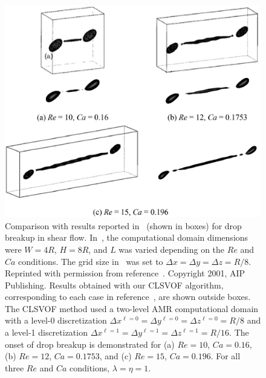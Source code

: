 \documentclass[review]{elsarticle}
\begin{document}
\begin{figure}[h!]
  \centering
  \includegraphics[width=\textwidth]{2-DropBreakComparison}
  \caption{Comparison with results reported 
	in~\cite{RenCri01-2} 
	(shown in boxes) 
        for drop breakup in shear flow.  
	In~\cite{RenCri01-2},
	the computational domain
        dimensions were 
	$W=4R$, $H=8R$, and $L$ was varied depending 
        on the $Re$ and $Ca$ conditions.  The
	grid size 
	in~\cite{RenCri01-2} 
	was set to 
        $\Delta x=\Delta y=\Delta z=R/8$.  
	Reprinted with permission from 
        reference~\cite{RenCri01-2}. 
	Copyright 2001, AIP Publishing. 
	Results
        obtained with our CLSVOF algorithm, corresponding to each case in
        reference~\cite{RenCri01-2}, are shown outside boxes.  The
        CLSVOF method used a two-level AMR computational domain 
        with a level-0 discretization 
	$\Delta x^{\ell=0} = \Delta y^{\ell=0} = \Delta z^{\ell=0} = R/8$ 
	and a level-1 discretization
        $\Delta x^{\ell=1} = \Delta y^{\ell=1} = \Delta z^{\ell=1} = R/16$. 
        The onset of drop breakup is demonstrated for (a) $Re=10$,
        $Ca=0.16$, (b) $Re=12$, $Ca=0.1753$, and (c) $Re=15$, $Ca=0.196$.
        For all three $Re$ and $Ca$ conditions, $\lambda = \eta = 1$.}
  \label{fig:DropBreakComp}
\end{figure}
%
\end{document}
